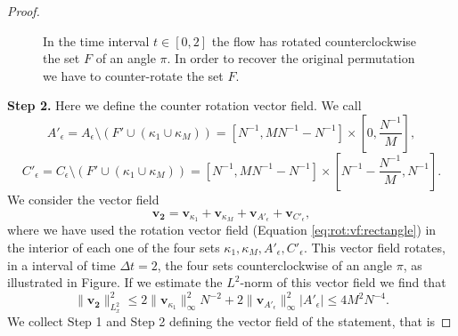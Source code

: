 \documentclass[10pt,a4paper]{amsart}
\begin{document}
\begin{proof}
\begin{figure}
       \caption{In the time interval $t\in[0,2]$ the flow has rotated counterclockwise the set $F$ of an angle $\pi$. In order to recover the original permutation we have to counter-rotate the set $F$.}
       \label{fig:lemmaS3}
   \end{figure}
   
   \textbf{Step 2.} Here we define the counter rotation vector field. We call
   $$A'_\epsilon=A_\epsilon\setminus (F'\cup (\kappa_1\cup\kappa_M))=[N^{-1},MN^{-1}-N^{-1}]\times\left[0,\frac{N^{-1}}{M}\right],$$
   $$C'_\epsilon=C_\epsilon\setminus (F'\cup (\kappa_1\cup\kappa_M))=[N^{-1},MN^{-1}-N^{-1}]\times\left[N^{-1}-\frac{N^{-1}}{M},N^{-1}\right].$$
    We consider the vector field
   \begin{equation*}
       \mathbf{ v_2}= \mathbf{ v}_{\kappa_1}+\mathbf{ v}_{\kappa_M}+\mathbf{v}_{A'_\epsilon}+\mathbf{v}_{C'_\epsilon},
   \end{equation*}
   where we have used the rotation vector field (Equation \eqref{eq:rot:vf:rectangle}) in the interior of each one of the four sets $\kappa_1,\kappa_M,A'_\epsilon,C'_\epsilon.$ 
 This vector field rotates, in a interval of time $\Delta t=2$, the four sets counterclockwise of an angle $\pi$, as illustrated in Figure. If we estimate the $L^2$-norm of this vector field we find that
 \begin{equation*}
     \|\mathbf{v_2}\|^2_{L^2_x}\leq 2\|\mathbf v_{\kappa_1}\|^2_\infty N^{-2}+2\|\mathbf v_{A'_\epsilon}\|_\infty^2|A'_\epsilon|\leq 4M^2N^{-4}.
 \end{equation*}
 We collect Step 1 and Step 2 defining the vector field of the statement, that is


\end{proof}
\end{document}
